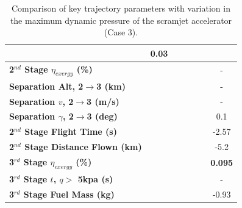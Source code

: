 \begin{table}[ht!]
\begin{tabular}{l c c c c c c}
	&0.03
	\\
	\hline 
	\textbf{2$^{nd}$ Stage $\eta_{exergy}$ (\%)}
	& \textbf{\secondExergyEffqFortyFiveNoReturn}
	& \textbf{\secondExergyEffqFortySevenNoReturn}
	& \textbf{\secondExergyEffqStandardNoReturn}
	& \textbf{\secondExergyEffqFiftyTwoNoReturn}
	& \textbf{\secondExergyEffqFiftyFiveNoReturn}
	& -
	\\
	\textbf{Separation Alt, 2$\rightarrow$3 (km)}
	& \secondthirdSeparationAltqFortyFiveNoReturn
	& \secondthirdSeparationAltqFortySevenNoReturn
	& \secondthirdSeparationAltqStandardNoReturn
	& \secondthirdSeparationAltqFiftyTwoNoReturn
	& \secondthirdSeparationAltqFiftyFiveNoReturn
	& -
	\\
	\textbf{Separation $v$, 2$\rightarrow$3 (m/s)}
	& \secondthirdSeparationvqFortyFiveNoReturn
	& \secondthirdSeparationvqFortySevenNoReturn
	& \secondthirdSeparationvqStandardNoReturn
	& \secondthirdSeparationvqFiftyTwoNoReturn
	& \secondthirdSeparationvqFiftyFiveNoReturn
	& -
	\\
	\textbf{Separation $\gamma$, 2$\rightarrow$3 (deg)}
	& \secondthirdSeparationgammaqFortyFiveNoReturn
	& \secondthirdSeparationgammaqFortySevenNoReturn
	& \secondthirdSeparationgammaqStandardNoReturn
	& \secondthirdSeparationgammaqFiftyTwoNoReturn
	& \secondthirdSeparationgammaqFiftyFiveNoReturn
	&0.1
	\\
	\textbf{2$^{nd}$ Stage Flight Time (s)}
	& \secondFlightTimeqFortyFiveNoReturn
	& \secondFlightTimeqFortySevenNoReturn
	& \secondFlightTimeqStandardNoReturn
	& \secondFlightTimeqFiftyTwoNoReturn
	& \secondFlightTimeqFiftyFiveNoReturn
	&-2.57
	\\
	\textbf{2$^{nd}$ Stage Distance Flown (km)}
	& \SecondDistqFortyFiveNoReturn
	& \SecondDistqFortySevenNoReturn
	& \SecondDistqStandardNoReturn
	& \SecondDistqFiftyTwoNoReturn
	& \SecondDistqFiftyFiveNoReturn
	&-5.2
	\\
	\hline 
	\textbf{3$^{rd}$ Stage $\eta_{exergy}$ (\%)}
	& \textbf{\thirddExergyEffqFortyFiveNoReturn}
	& \textbf{\thirddExergyEffqFortySevenNoReturn}
	& \textbf{\thirddExergyEffqStandardNoReturn}
	& \textbf{\thirddExergyEffqFiftyTwoNoReturn}
	& \textbf{\thirddExergyEffqFiftyFiveNoReturn}
	& \textbf{0.095}
	\\
	\textbf{3$^{rd}$ Stage $t$, $q >$ 5kpa (s)}
	& \thirdqOverFiveqFortyFiveNoReturn
	& \thirdqOverFiveqFortySevenNoReturn
	& \thirdqOverFiveqStandardNoReturn
	& \thirdqOverFiveqFiftyTwoNoReturn
	& \thirdqOverFiveqFiftyFiveNoReturn
	& -
	\\
	\textbf{3$^{rd}$ Stage Fuel Mass (kg)}
	& \thirdmFuelqFortyFiveNoReturn
	& \thirdmFuelqFortySevenNoReturn
	& \thirdmFuelqStandardNoReturn
	& \thirdmFuelqFiftyTwoNoReturn
	& \thirdmFuelqFiftyFiveNoReturn
	&-0.93
	\\
	\hline 
\end{tabular} 
	\caption{Comparison of key trajectory parameters with variation in the maximum dynamic pressure of the scramjet accelerator (Case 3).}
	\label{tab:qvarnoreturn}
\end{table}


